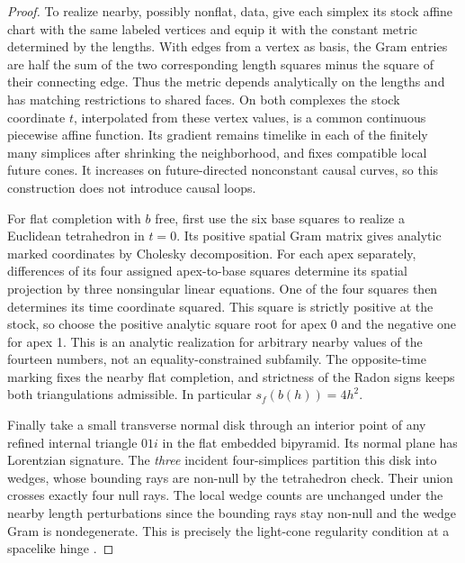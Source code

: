 \documentclass[11pt]{article}
\begin{document}
\begin{proof}
To realize nearby, possibly nonflat, data, give each simplex its stock affine chart with the same labeled vertices and equip it with the constant metric determined by the lengths. With edges from a vertex as basis, the Gram entries are half the sum of the two corresponding length squares minus the square of their connecting edge. Thus the metric depends analytically on the lengths and has matching restrictions to shared faces. On both complexes the stock coordinate \(t\), interpolated from these vertex values, is a common continuous piecewise affine function. Its gradient remains timelike in each of the finitely many simplices after shrinking the neighborhood, and fixes compatible local future cones. It increases on future-directed nonconstant causal curves, so this construction does not introduce causal loops.

For flat completion with \(b\) free, first use the six base squares to realize a Euclidean tetrahedron in \(t=0\). Its positive spatial Gram matrix gives analytic marked coordinates by Cholesky decomposition. For each apex separately, differences of its four assigned apex-to-base squares determine its spatial projection by three nonsingular linear equations. One of the four squares then determines its time coordinate squared. This square is strictly positive at the stock, so choose the positive analytic square root for apex 0 and the negative one for apex 1. This is an analytic realization for arbitrary nearby values of the fourteen numbers, not an equality-constrained subfamily. The opposite-time marking fixes the nearby flat completion, and strictness of the Radon signs keeps both triangulations admissible. In particular \(s_f(b(h))=4h^2\).

Finally take a small transverse normal disk through an interior point of any refined internal triangle \(01i\) in the flat embedded bipyramid. Its normal plane has Lorentzian signature. The \emph{three} incident four-simplices partition this disk into wedges, whose bounding rays are non-null by the tetrahedron check. Their union crosses exactly four null rays. The local wedge counts are unchanged under the nearby length perturbations since the bounding rays stay non-null and the wedge Gram is nondegenerate. This is precisely the light-cone regularity condition at a spacelike hinge \cite[Eq.~(32)]{ADP}.
\end{proof}
\end{document}
